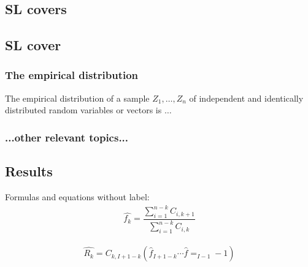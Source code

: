 \documentclass[11pt]{article}
\begin{document}
\subsection*{SL covers}

\subsection*{SL cover}






%

\subsubsection*{The empirical distribution}
The empirical distribution of a sample $Z_1, \dots, Z_n$ of independent and identically distributed random variables or vectors is $\ldots$

\subsubsection*{...other relevant topics...}





\subsection*{Results}



Formulas and equations without label:
\begin{align*}
	\hat{f_k} = \dfrac{\sum_{i=1}^{n-k} C_{i,k+1}} {\sum_{i=1}^{n-k} C_{i,k}}
\end{align*}

\begin{align*}
	\hat{R_k} = C_{k,I+1-k} \left(  \hat{f}_{I+1-k} \cdots \hat{f}=_{I-1}-1\right)
\end{align*}

\end{document}

